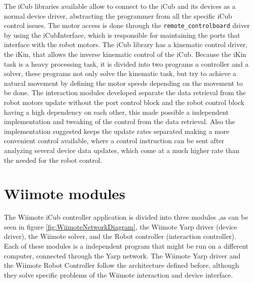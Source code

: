 	The iCub libraries available allow to connect to the iCub and its devices as a normal device driver, abstracting the programmer from all the specific iCub control issues. The motor access is done through the \verb|remote_controlboard| driver by using the iCubInterface, which is responsible for maintaining the ports that interface with the robot motors. The iCub library has a kinematic control driver, the iKin, that allows the inverse kinematic control of the iCub. Because the iKin task is a heavy processing task, it is divided into two programs a controller and a solver, these programs not only solve the kinematic task, but try to achieve a natural movement by defining the motor speeds depending on the movement to be done. The interaction modules developed separate the data retrieval from the robot motors update without the port control block and the robot control block having a high dependency on each other, this made possible a independent implementation and tweaking of the control from the data retrieval. Also the implementation suggested keeps the update rates separated making a more convenient control available, where a control instruction can be sent after analyzing several device data updates, which come at a much higher rate than the needed for the robot control.

\section{Wiimote modules}

	The \ac{Wiimote} iCub controller application is divided into three modules ,as can be seen in figure \ref{fig:WiimoteNetworkDiagram}, the \ac{Wiimote} Yarp driver (device driver), the \ac{Wiimote} solver, and the Robot controller (interaction controller). Each of these modules is a independent program that might be run on a different computer, connected through the Yarp network. The \ac{Wiimote} Yarp driver and the \ac{Wiimote} Robot Controller follow the architecture defined before, although they solve specific problems of the \ac{Wiimote} interaction and device interface.
	
